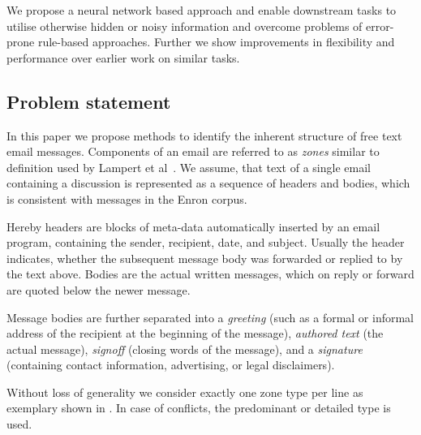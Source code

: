 \documentclass{llncs}
\begin{document}
We propose a neural network based approach and enable downstream tasks to utilise otherwise hidden or noisy information and overcome problems of error-prone rule-based approaches.
Further we show improvements in flexibility and performance over earlier work on similar tasks.









\subsection{Problem statement}
In this paper we propose methods to identify the inherent structure of free text email messages.
Components of an email are referred to as \textit{zones} similar to definition used by Lampert et al~\cite{zones}.
We assume, that text of a single email containing a discussion is represented as a sequence of headers and bodies, which is consistent with messages in the Enron corpus.

Hereby headers are blocks of meta-data automatically inserted by an email program, containing the sender, recipient, date, and subject.
Usually the header indicates, whether the subsequent message body was forwarded or replied to by the text above.
Bodies are the actual written messages, which on reply or forward are quoted below the newer message.

Message bodies are further separated into a \textit{greeting} (such as a formal or informal address of the recipient at the beginning of the message), \textit{authored text} (the actual message), \textit{signoff} (closing words of the message), and a \textit{signature} (containing contact information, advertising, or legal disclaimers).

Without loss of generality we consider exactly one zone type per line as exemplary shown in .
In case of conflicts, the predominant or detailed type is used.


\end{document}
